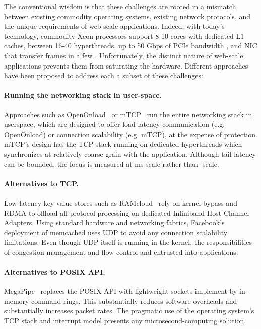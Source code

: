 The conventional wisdom is that these challenges are rooted in a
mismatch between existing commodity operating systems, existing
network protocols, and the unique requirements of web-scale
applications.  Indeed, with today's technology, commodity Xeon
processors support 8-10 cores with dedicated L1 caches, between 16-40
hyperthreads, up to 50 Gbps of PCIe bandwidth , and NIC that transfer
frames in a few \microsecond.  Unfortunately, the distinct nature of
web-scale applications prevents them from saturating the hardware.
Different approaches have been proposed to address each a subset of
these challenges:

\paragraph{Running the networking stack in user-space.}  

Approaches such as OpenOnload~\cite{openonload} or
mTCP~\cite{jeong2014mtcp} run the entire networking stack in
userspace, which are designed to offer load-latency communication
(e.g. OpenOnload) or connection scalability (e.g. mTCP), at the
expense of protection.  mTCP's design has the TCP stack running on
dedicated hyperthreads which synchronizes at relatively coarse grain
with the application. Although tail latency can be bounded, the focus
is measured at ms-scale rather than \microsecond-scale.

\paragraph{Alternatives to TCP.}

Low-latency key-value stores such as
RAMcloud~\cite{DBLP:conf/sosp/OngaroRSOR11} rely on kernel-bypass and
RDMA to offload all protocol processing on dedicated Infiniband Host Channel
Adapters.  Using standard hardware and networking fabrics, Facebook's
deployment of memcached uses UDP to avoid any connection scalability
limitations.  Even though UDP itself is running in the kernel, the
responsibilities of congestion management and flow control and
entrusted into applications.

\paragraph{Alternatives to POSIX API.}

MegaPipe~\cite{han2012megapipe} replaces the POSIX API with
lightweight sockets implement by in-memory command rings.  This
substantially reduces software overheads and substantially increases
packet rates.  The pragmatic use of the operating system's TCP stack
and interrupt model presents any microsecond-computing solution.

